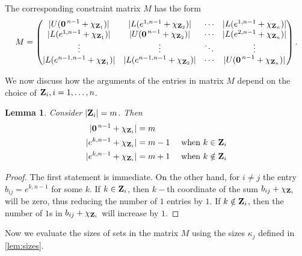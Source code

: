 \documentclass[12pt]{amsart}
\newcommand{\bZ}{{\bf Z}}
\newtheorem{lem}[thm]{Lemma}
\theoremstyle{definition}
\begin{document}
The corresponding constraint matrix $M$ has the form
\begin{equation}
\label{eq:signed-constraint-matrix}
M=\begin{pmatrix}
|U(\boldsymbol{0}^{\,n-1}+\chi_{\bZ_1})| & |L(e^{1,n-1}+\chi_{\bZ_2})| & \cdots & |L(e^{1,n-1}+\chi_{\bZ_n})| \\
|L(e^{1,n-1}+\chi_{\bZ_1})| & |U(\boldsymbol{0}^{\,n-1}+\chi_{\bZ_2})| & \cdots & |L(e^{2,n-1}+\chi_{\bZ_n})| \\
\vdots & \vdots & \ddots & \vdots \\
|L(e^{n-1,n-1}+\chi_{\bZ_1})| & |L(e^{n-1,n-1}+\chi_{\bZ_2})| & \cdots & |U(\boldsymbol{0}^{\,n-1}+\chi_{\bZ_n})|
\end{pmatrix}.
\end{equation}

We now discuss how the arguments of the entries in matrix $M$ depend on the choice of $\bZ_i,i=1, \ldots,n$.

\begin{lem}\label{lem:LUrepeat}
    Consider $|\bZ_i|=m$. Then 
    \begin{align*}
        | \boldsymbol{0}^{\,n-1}+\chi_{\bZ_i}| &=m \\
         |e^{k,n-1}+\chi_{\bZ_i}| &=m-1 \quad \mbox{ when } k \in \bZ_i\\
         |e^{k,n-1}+\chi_{\bZ_i}| &=m+1 \quad \mbox{ when } k \notin \bZ_i\\
    \end{align*}
\end{lem}
\begin{proof}
   The first statement is immediate.
    On the other hand, for $i\not = j$ the entry $b_{ij} = e^{k,n-1}$ for some $k$. If $k\in \bZ_i$, then $k-$th coordinate of the sum $b_{ij} +\chi_{\bZ_i}$  will be zero, thus reducing the number of $1$ entries by $1$. If $k \notin \bZ_i$, then the number of $1$s in $b_{ij} +\chi_{\bZ_i}$ will increase by $1$.
\end{proof}

Now we evaluate the sizes of sets in the matrix $M$ using the sizes $\kappa_j$ defined in \cref{lem:sizes}.
\end{document}
